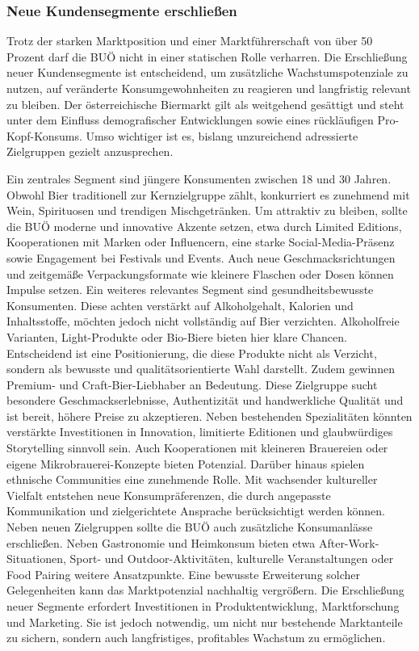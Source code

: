 \subsubsection{Neue Kundensegmente erschließen}
Trotz der starken Marktposition und einer Marktführerschaft von über 50 Prozent darf die BUÖ nicht in einer statischen Rolle verharren. Die Erschließung neuer Kundensegmente ist entscheidend, um zusätzliche Wachstumspotenziale zu nutzen, auf veränderte Konsumgewohnheiten zu reagieren und langfristig relevant zu bleiben. Der österreichische Biermarkt gilt als weitgehend gesättigt und steht unter dem Einfluss demografischer Entwicklungen sowie eines rückläufigen Pro-Kopf-Konsums. Umso wichtiger ist es, bislang unzureichend adressierte Zielgruppen gezielt anzusprechen.

Ein zentrales Segment sind jüngere Konsumenten zwischen 18 und 30 Jahren. Obwohl Bier traditionell zur Kernzielgruppe zählt, konkurriert es zunehmend mit Wein, Spirituosen und trendigen Mischgetränken. Um attraktiv zu bleiben, sollte die BUÖ moderne und innovative Akzente setzen, etwa durch Limited Editions, Kooperationen mit Marken oder Influencern, eine starke Social-Media-Präsenz sowie Engagement bei Festivals und Events. Auch neue Geschmacksrichtungen und zeitgemäße Verpackungsformate wie kleinere Flaschen oder Dosen können Impulse setzen. Ein weiteres relevantes Segment sind gesundheitsbewusste Konsumenten. Diese achten verstärkt auf Alkoholgehalt, Kalorien und Inhaltsstoffe, möchten jedoch nicht vollständig auf Bier verzichten. Alkoholfreie Varianten, Light-Produkte oder Bio-Biere bieten hier klare Chancen. Entscheidend ist eine Positionierung, die diese Produkte nicht als Verzicht, sondern als bewusste und qualitätsorientierte Wahl darstellt. Zudem gewinnen Premium- und Craft-Bier-Liebhaber an Bedeutung. Diese Zielgruppe sucht besondere Geschmackserlebnisse, Authentizität und handwerkliche Qualität und ist bereit, höhere Preise zu akzeptieren. Neben bestehenden Spezialitäten könnten verstärkte Investitionen in Innovation, limitierte Editionen und glaubwürdiges Storytelling sinnvoll sein. Auch Kooperationen mit kleineren Brauereien oder eigene Mikrobrauerei-Konzepte bieten Potenzial. Darüber hinaus spielen ethnische Communities eine zunehmende Rolle. Mit wachsender kultureller Vielfalt entstehen neue Konsumpräferenzen, die durch angepasste Kommunikation und zielgerichtete Ansprache berücksichtigt werden können. Neben neuen Zielgruppen sollte die BUÖ auch zusätzliche Konsumanlässe erschließen. Neben Gastronomie und Heimkonsum bieten etwa After-Work-Situationen, Sport- und Outdoor-Aktivitäten, kulturelle Veranstaltungen oder Food Pairing weitere Ansatzpunkte. Eine bewusste Erweiterung solcher Gelegenheiten kann das Marktpotenzial nachhaltig vergrößern. Die Erschließung neuer Segmente erfordert Investitionen in Produktentwicklung, Marktforschung und Marketing. Sie ist jedoch notwendig, um nicht nur bestehende Marktanteile zu sichern, sondern auch langfristiges, profitables Wachstum zu ermöglichen.

